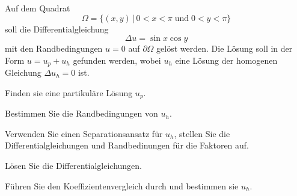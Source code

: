 Auf dem Quadrat
\begin{equation}
\Omega = \{ (x,y)\,|\, 0<x<\pi \;\text{und}\; 0 < y < \pi \}
\label{40000018:domain}
\end{equation}
soll die Differentialgleichung
\begin{equation}
\Delta u = \sin x\cos y
\label{40000018:pde}
\end{equation}
mit den Randbedingungen $u=0$ auf $\partial\Omega$ gelöst werden.
Die Lösung soll in der Form $u=u_p+u_h$ gefunden werden, wobei
$u_h$ eine Lösung der homogenen Gleichung $\Delta u_h=0$ ist.
\begin{teilaufgaben}
\item
Finden sie eine partikuläre Lösung $u_p$.
\item
Bestimmen Sie die Randbedingungen von $u_h$.
\item
Verwenden Sie einen Separationsansatz für $u_h$, stellen Sie die
Differentialgleichungen und Randbedinungen für die Faktoren auf.
\item
Lösen Sie die Differentialgleichungen.
\item
Führen Sie den Koeffizientenvergleich durch und bestimmen sie $u_h$.
\end{teilaufgaben}


